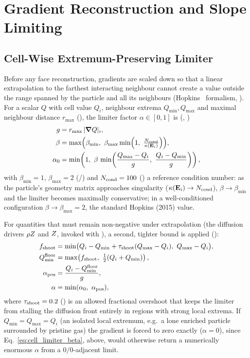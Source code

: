 \section{Gradient Reconstruction and Slope Limiting}
\label{sec:gradients}

\subsection{Cell-Wise Extremum-Preserving Limiter}
Before any face reconstruction, gradients are scaled down so
that a linear extrapolation to the farthest interacting neighbour cannot
create a value outside the range spanned by the particle and all its
neighbours (Hopkins~\citeyear{Hopkins2015} formalism,
). For a scalar $Q$ with cell value
$Q_i$, neighbour extrema $Q_{\min}, Q_{\max}$ and maximal neighbour
distance $r_{\max}$ (), the limiter factor
$\alpha\in[0,1]$ is (,
)
\begin{align}
  g &= r_{\max}\, |\grad Q|_i , \\
  \beta &= \max\!\Big(\beta_{\min},\ \beta_{\max}\min\!\Big(1,\ \tfrac{N_{\rm cond}}{\kappa(\mathbf E_i)}\Big)\Big) ,
  \label{eq:cell_limiter_beta} \\
  \alpha_0 &= \min\!\left(1,\ \beta \, \min\!\left(\frac{Q_{\max}-Q_i}{g},\ \frac{Q_i - Q_{\min}}{g}\right)\right) ,
\end{align}
with $\beta_{\min}=1$, $\beta_{\max}=2$
(/) and $N_{\rm cond}=100$
() a reference condition number:
as the particle's geometry matrix approaches singularity
($\kappa(\mathbf E_i)\to N_{\rm cond}$), $\beta\to\beta_{\min}$ and the
limiter becomes maximally conservative; in a well-conditioned
configuration $\beta\to\beta_{\max}=2$, the standard Hopkins (2015)
value.

For quantities that must remain non-negative under extrapolation
(the diffusion drivers $\rho Z$ and $Z$, invoked with
), a second, tighter bound is applied
():
\begin{align}
  f_{\rm shoot} &= \min\!\big(Q_i - Q_{\min} + \tau_{\rm shoot}(Q_{\max}-Q_i),\ Q_{\max}-Q_i\big) , \\
  Q_{\min}^{\rm floor} &= \max\!\left(f_{\rm shoot},\ \tfrac12(Q_i+Q_{\min})\right) , \\
  \alpha_{\rm pos} &= \frac{Q_i - Q_{\min}^{\rm floor}}{g} , \\
  \alpha &= \min(\alpha_0,\ \alpha_{\rm pos}) ,
\end{align}
where $\tau_{\rm shoot} = 0.2$
() is an allowed
fractional overshoot that keeps the limiter from stalling the diffusion
front entirely in regions with strong local extrema. If
$Q_{\min}=Q_{\max}=Q_i$ (an isolated local extremum, e.g.\ a lone
enriched particle surrounded by pristine gas) the gradient is forced to
zero exactly ($\alpha=0$), since Eq.~\eqref{eq:cell_limiter_beta}, above,
would otherwise return a numerically enormous $\alpha$ from a
$0/0$-adjacent limit.

